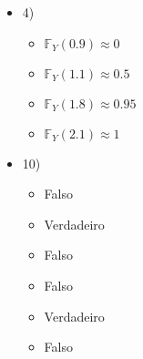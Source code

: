 \documentclass[11pt,a4paper]{book}
\begin{document}
\begin{itemize}
		\item 4)
		
		\begin{itemize}
			\item $\mathbb{F}_Y(0.9)\approx 0$
			\item $\mathbb{F}_Y(1.1)\approx 0.5$
			\item $\mathbb{F}_Y(1.8)\approx 0.95$
			\item $\mathbb{F}_Y(2.1)\approx 1$
		\end{itemize}
		
		\item 10)
		
		\begin{itemize}
			\item Falso
			\item Verdadeiro
			\item Falso
			\item Falso
			\item Verdadeiro
			\item Falso
		\end{itemize}
	\end{itemize}
\end{document}
